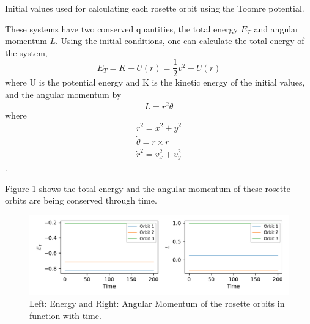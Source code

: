 \begin{table}
  \begin{center}
    \caption{Initial values used for calculating each rosette orbit using the Toomre potential.}
    \label{tab:ToomreOrbits}
  \end{center}
\end{table}

These systems have two conserved quantities, the total energy $E_T$ and angular momentum $L$. Using the initial conditions, one can calculate the total energy of the system,
\begin{equation}
    E_T=K + U(r) = \frac{1}{2}v^2 + U(r)
\end{equation}
where U is the potential energy and K is the kinetic energy of the initial values, and the angular momentum by
\begin{equation}
    L=r^2\Dot{\theta}
\end{equation}
where 
\begin{align}
    r^2 = x^2 + y^2\\
    \Dot{\theta} = r \times \dot{r}\\
    \dot{r}^2 = v_x^2 + v_y^2
\end{align}.

Figure \ref{fig:conservedQuants} shows the total energy and the angular momentum of these rosette orbits are being conserved through time. 
\begin{figure}[h!]
    \centering
    \includegraphics{CodeAndFigures/EnergyMomentumPlot.pdf}
    \caption{Left: Energy and Right: Angular Momentum of the rosette orbits in function with time.}
    \label{fig:conservedQuants}
\end{figure}

